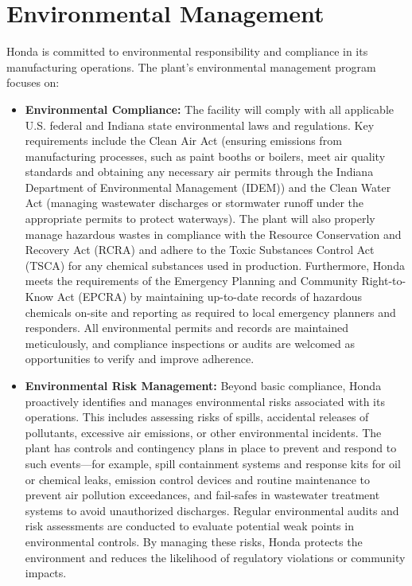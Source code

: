 \section{Environmental Management}
Honda is committed to environmental responsibility and compliance in its manufacturing operations. The plant’s environmental management program focuses on:
\begin{itemize}
    \item \textbf{Environmental Compliance:} The facility will comply with all applicable U.S. federal and Indiana state environmental laws and regulations. Key requirements include the Clean Air Act (ensuring emissions from manufacturing processes, such as paint booths or boilers, meet air quality standards and obtaining any necessary air permits through the Indiana Department of Environmental Management (IDEM)) and the Clean Water Act (managing wastewater discharges or stormwater runoff under the appropriate permits to protect waterways). The plant will also properly manage hazardous wastes in compliance with the Resource Conservation and Recovery Act (RCRA) and adhere to the Toxic Substances Control Act (TSCA) for any chemical substances used in production. Furthermore, Honda meets the requirements of the Emergency Planning and Community Right-to-Know Act (EPCRA) by maintaining up-to-date records of hazardous chemicals on-site and reporting as required to local emergency planners and responders. All environmental permits and records are maintained meticulously, and compliance inspections or audits are welcomed as opportunities to verify and improve adherence.
    \item \textbf{Environmental Risk Management:} Beyond basic compliance, Honda proactively identifies and manages environmental risks associated with its operations. This includes assessing risks of spills, accidental releases of pollutants, excessive air emissions, or other environmental incidents. The plant has controls and contingency plans in place to prevent and respond to such events—for example, spill containment systems and response kits for oil or chemical leaks, emission control devices and routine maintenance to prevent air pollution exceedances, and fail-safes in wastewater treatment systems to avoid unauthorized discharges. Regular environmental audits and risk assessments are conducted to evaluate potential weak points in environmental controls. By managing these risks, Honda protects the environment and reduces the likelihood of regulatory violations or community impacts.

\end{itemize}
